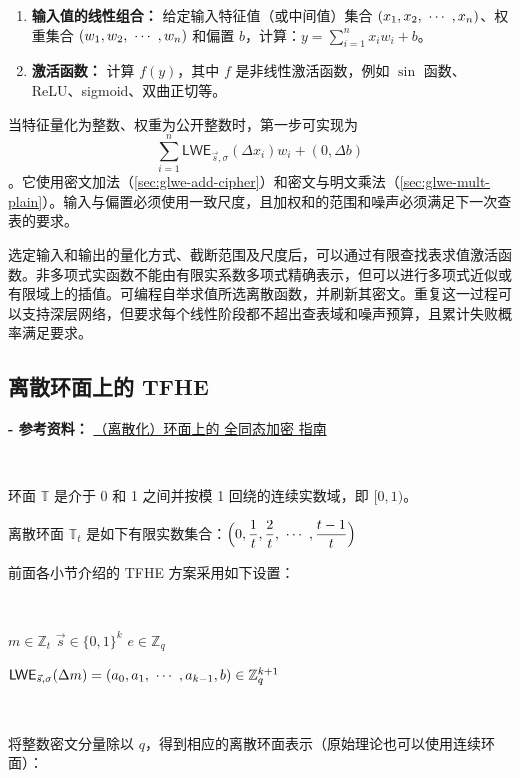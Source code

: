 \begin{enumerate}
  \item \textbf{输入值的线性组合：} 给定输入特征值（或中间值）集合 $(x_1, x_2, \text{ } \text{$\cdots$} \text{ }, x_n)$、权重集合 $(w_1, w_2, \text{ } \text{$\cdots$} \text{ }, w_n)$ 和偏置 $b$，计算：$y = \sum\limits_{i=1}^{n}x_iw_i + b$。
\item \textbf{激活函数：} 计算 $f(y)$，其中 $f$ 是非线性激活函数，例如 $\sin$ 函数、ReLU、sigmoid、双曲正切等。
\end{enumerate}

当特征量化为整数、权重为公开整数时，第一步可实现为
\[
\sum_{i=1}^n\textsf{LWE}_{\vec s,\sigma}(\Delta x_i)w_i+(0,\Delta b)
\]
。它使用密文加法（\autoref{sec:glwe-add-cipher}）和密文与明文乘法（\autoref{sec:glwe-mult-plain}）。输入与偏置必须使用一致尺度，且加权和的范围和噪声必须满足下一次查表的要求。

选定输入和输出的量化方式、截断范围及尺度后，可以通过有限查找表求值激活函数。非多项式实函数不能由有限实系数多项式精确表示，但可以进行多项式近似或有限域上的插值。可编程自举求值所选离散函数，并刷新其密文。重复这一过程可以支持深层网络，但要求每个线性阶段都不超出查表域和噪声预算，且累计失败概率满足要求。



\subsection{离散环面上的 TFHE}
\label{subsec:torus}

\textbf{- 参考资料：}
\href{https://eprint.iacr.org/2021/1402.pdf}{（离散化）环面上的
全同态加密
指南}~\cite{torus}

$ $

环面 $\mathbb{T}$ 是介于 0 和 1 之间并按模 1 回绕的连续实数域，即 $[0, 1)$。

离散环面 $\mathbb{T}_t$ 是如下有限实数集合：$\Big(0, \dfrac{1}{t}, \dfrac{2}{t}, \text{ } \text{$\cdots$} \text{ }, \dfrac{t - 1}{t}\Big)$


前面各小节介绍的 TFHE 方案采用如下设置：

$ $

$m \in \mathbb{Z}_t$ 
$\vec{s} \in \{0, 1\}^{k}$
$e \in \mathbb{Z}_q$

$\textsf{LWE}_{\vec{s}, \sigma}(\Delta m) = (a_0, a_1, \text{ } \text{$\cdots$} \text{ }, a_{k-1}, b) \in \mathbb{Z}_q^{k + 1}$

$ $

将整数密文分量除以 $q$，得到相应的离散环面表示（原始理论也可以使用连续环面）：


$ $

